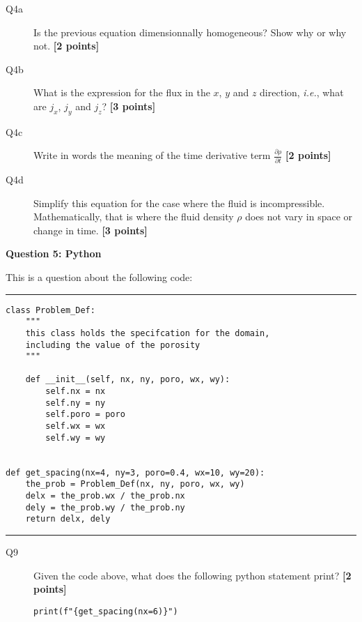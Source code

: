 \documentclass{article}
\begin{document}
\begin{description}
\item [Q4a] Is the previous equation dimensionnally homogeneous? Show why or why not. \textbf{[2 points]}
\vspace{2cm}
\item [Q4b] What is the expression for the flux in the $x$, $y$ and $z$ direction, \textit{i.e.}, what are $j_x$, $j_y$ and $j_z$? \textbf{[3 points]}
\vspace{2cm}
\item [Q4c] Write in words the meaning of the time derivative term $\frac{\partial \rho}{\partial t}$ \textbf{[2 points]}
\vspace{2cm}
\item [Q4d] Simplify this equation for the case where the fluid is incompressible. Mathematically, that is where the fluid density $\rho$ does not vary in space or change in time. \textbf{[3 points]}
\vspace{2cm}
\end{description}




\newpage
\textbf{Question 5: Python}


This is a question about the following code:

\rule{15cm}{0.75pt}


\begin{verbatim}
class Problem_Def:
    """
    this class holds the specifcation for the domain,
    including the value of the porosity
    """

    def __init__(self, nx, ny, poro, wx, wy):
        self.nx = nx
        self.ny = ny
        self.poro = poro
        self.wx = wx
        self.wy = wy


def get_spacing(nx=4, ny=3, poro=0.4, wx=10, wy=20):
    the_prob = Problem_Def(nx, ny, poro, wx, wy)
    delx = the_prob.wx / the_prob.nx
    dely = the_prob.wy / the_prob.ny
    return delx, dely
\end{verbatim}

\rule{15cm}{0.75pt}

\begin{description}

\item[Q9] Given the code above, what does the following python statement print?
  \textbf{[2 points]}
  
\verb+print(f"{get_spacing(nx=6)}")+

\vspace{1.5cm}
  
\end{description}
\end{document}
